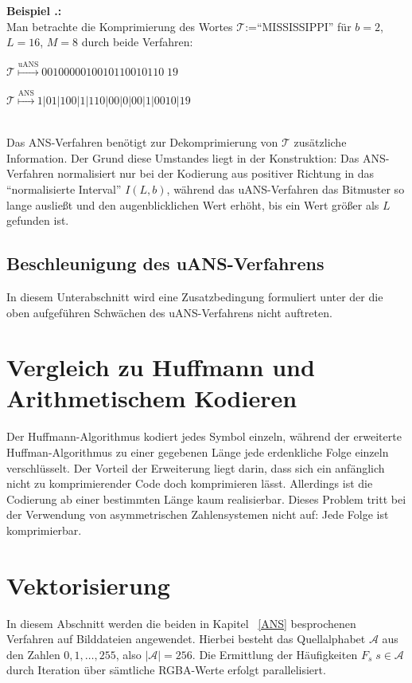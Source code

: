 \documentclass[a4paper,12pt]{article}
\newcommand{\A}{\mathcal A}
\newcounter{Beispiel}
\newcounter{Algorithmus}
\newenvironment{Beispiel}{
\medskip
        
        \setlength{\parindent}{0pt}
        \addtocounter{Beispiel}{1}
        \textbf{\textsf{Beispiel \thesubsection.\theBeispiel}:}\\}{
        \nopagebreak
        \vspace{-1.0ex}
        \bigskip
        
}
\begin{document}
\begin{Beispiel}
Man betrachte die Komprimierung des Wortes $\mathcal{T}$:="`MISSISSIPPI"'  für $b=2$, $L=16$, $M=8$ durch beide Verfahren:
\par
\vspace{0.5cm}
\begin{minipage}[h]{.5\textwidth}
$\mathcal{T}\stackrel{\text{uANS}}{\mapsto} 0010000010010110010110\;19$
\end{minipage}
\hfill
 \begin{minipage}[h]{.5\textwidth}
$\mathcal{T}\stackrel{\text{ANS}}{\mapsto} 1|01|100|1|110|00|0|00|1|0010|19$
\end{minipage}   
\vspace{0.5cm}
\\
Das ANS-Verfahren benötigt zur Dekomprimierung von $\mathcal{T}$ zusätzliche Information. Der Grund diese Umstandes liegt in der Konstruktion: Das ANS-Verfahren normalisiert nur bei der Kodierung aus positiver Richtung in das "`normalisierte Interval"' $I(L,b)$, während das uANS-Verfahren das Bitmuster so lange ausließt und den augenblicklichen Wert erhöht, bis ein Wert größer als $L$ gefunden ist.

\end{Beispiel}
\subsection{Beschleunigung des uANS-Verfahrens}
In diesem Unterabschnitt wird eine Zusatzbedingung formuliert unter der die oben aufgeführen Schwächen des uANS-Verfahrens nicht auftreten.

\section{Vergleich zu Huffmann und Arithmetischem Kodieren}
Der Huffmann-Algorithmus kodiert jedes Symbol einzeln, während der erweiterte Huffman-Algorithmus zu einer gegebenen Länge jede erdenkliche Folge einzeln verschlüsselt. Der Vorteil der Erweiterung liegt darin, dass sich ein anfänglich nicht zu komprimierender Code doch komprimieren lässt. Allerdings ist die Codierung ab einer bestimmten Länge kaum realisierbar. Dieses Problem tritt bei der Verwendung von asymmetrischen Zahlensystemen nicht auf: Jede Folge ist komprimierbar.

\newpage
\section{Vektorisierung}
In diesem Abschnitt werden die beiden in Kapitel ~\ref{ANS} besprochenen Verfahren auf Bilddateien angewendet. 
Hierbei besteht das Quellalphabet $\A$ aus den Zahlen $0,1,\ldots,255$, also $\left|\A\right| = 256$. Die Ermittlung der Häufigkeiten $F_{s}\;s\in\A$ durch Iteration über sämtliche RGBA-Werte erfolgt parallelisiert. 
\end{document}
